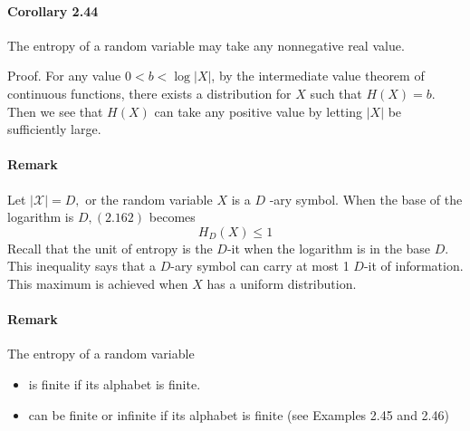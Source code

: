 \documentclass[8pt]{article}
\begin{document}
\begin{tcolorbox}
\paragraph{Corollary 2.44} The entropy of a random variable may take any nonnegative real value.
\end{tcolorbox}
Proof. For any value $0 < b< \log |X|$, by the intermediate
value theorem of continuous functions, there exists a distribution for $X$ such that 
$H(X) = b$. Then we see that $H(X)$ can take any positive value by letting
$|X|$ be sufficiently large.

\paragraph{Remark} Let $|\mathcal{X}|=D,$ or the random variable $X$ is a $D$ -ary symbol. When the base of the logarithm is $D,(2.162)$ becomes
$$
H_{D}(X) \leq 1
$$
Recall that the unit of entropy is the $D$-it when the logarithm is in the base $D$. This inequality says that a $D$-ary symbol can carry at most 1 $D$-it of information. This maximum is achieved when $X$ has a uniform distribution.

\paragraph{Remark} The entropy of a random variable
\begin{itemize}
	\item is finite if its alphabet is finite.
	\item can be finite or infinite if its alphabet is finite (see Examples 2.45 and 2.46)
\end{itemize}
\end{document}
